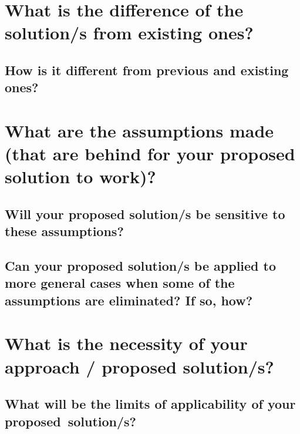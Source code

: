 	
\section*{\thesection\quad What is the difference of the solution/s from existing ones?}
	
\graytx{\blindtext}

\subsection*{\thesubsection\quad How is it different from previous and existing ones?}

\graytx{\blindtext}
	
	
	
	
	
	
\section*{\thesection\quad What are the assumptions made (that are behind for your proposed solution to work)?}
	
\graytx{\blindtext}
		
	
\subsection*{\thesubsection\quad Will your proposed solution/s be sensitive to these assumptions?}
	
\graytx{\blindtext}

  
\subsection*{\thesubsection\quad Can your proposed solution/s be applied to more general cases when some of the assumptions are eliminated? If so, how?}

\graytx{\blindtext}






\section*{\thesection\quad What is the necessity of your approach / proposed solution/s?}

\graytx{\blindtext}
	
	
\subsection*{\thesubsection\quad What will be the limits of applicability of your proposed~solution/s?}

